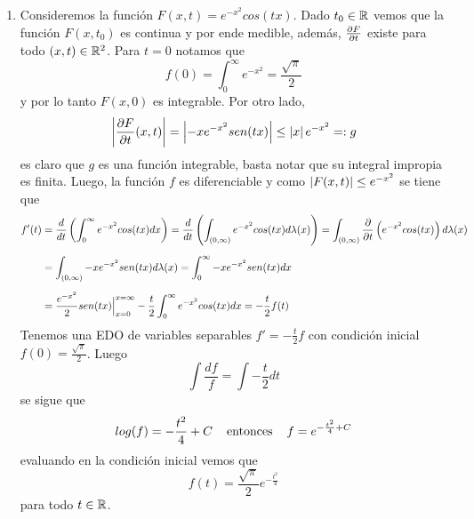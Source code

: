 \documentclass{article}
\begin{document}
\begin{enumerate}
    \item Consideremos la función $F(x,t)=e^{-x^{2}}cos(tx)$. Dado $t_{0}\in\mathbb{R}$ vemos que la 
    función $F(x,t_{0})$ es continua y por ende medible, además, $\frac{\partial F}{\partial t}$ existe para todo
    $(x,t)\in\mathbb{R}^{2}$. Para $t=0$ notamos que
    \begin{equation*}
        f(0)=\int_{0}^{\infty}e^{-x^{2}}=\frac{\sqrt{\pi}}{2}
    \end{equation*}
    y por lo tanto $F(x,0)$ es integrable. Por otro lado,
    \begin{equation*}
        \left|\frac{\partial F}{\partial t}(x,t) \right|=\left|-xe^{-x^{2}}sen(tx) \right|\leq \left|x \right|e^{-x^{2}}=:g
    \end{equation*}
    es claro que $g$ es una función integrable, basta notar que su integral impropia es finita.
    Luego, la función $f$ es diferenciable y como $\left|F(x,t) \right|\leq e^{-x^{2}}$ se tiene que
    \begin{align*}
        f'(t) &= \frac{d}{dt}\left(\int_{0}^{\infty}e^{-x^{2}}cos(tx)dx\right)
        =\frac{d}{dt}\left(\int_{(0,\infty)}e^{-x^{2}}cos(tx)d\lambda(x)\right)
        =\int_{(0,\infty)}\frac{\partial}{\partial t}\left(e^{-x^{2}}cos(tx)\right)d\lambda(x) \\[2mm]
        &= \int_{(0,\infty)}-xe^{-x^{2}}sen(tx)d\lambda(x)=\int_{0}^{\infty}-xe^{-x^{2}}sen(tx)dx 
        \\[2mm]
        &=\frac{e^{-x^{2}}}{2}sen(tx)\Big|_{x=0}^{x=\infty}
        -\frac{t}{2}\int_{0}^{\infty}e^{-x^{2}}cos(tx)dx=-\frac{t}{2}f(t)
    \end{align*}
    Tenemos una EDO de variables separables $f'=-\frac{t}{2}f$ con condición inicial
    $f(0)=\frac{\sqrt{\pi}}{2}$. Luego
    \begin{equation*}
        \int\frac{df}{f}=\int-\frac{t}{2}dt
    \end{equation*}
    se sigue que
    \begin{equation*}
        log(f)=-\frac{t^{2}}{4}+C\hspace{4mm}\text{entonces}\hspace{4mm}f=e^{-\frac{t^{2}}{4}+C}
    \end{equation*}
    evaluando en la condición inicial vemos que
    \begin{equation*}
        f(t)=\frac{\sqrt{\pi}}{2}e^{-\frac{t^{2}}{4}}
    \end{equation*}
    para todo $t\in\mathbb{R}$.
    

\end{enumerate}
\end{document}
